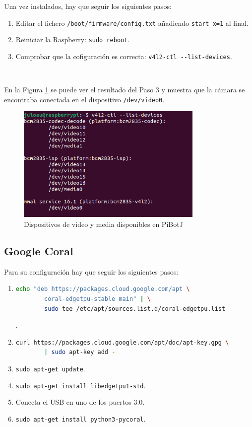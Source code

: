 Una vez instalados, hay que seguir los siguientes pasos: 

\begin{enumerate}
	\item Editar el fichero \verb|/boot/firmware/config.txt| añadiendo \verb|start_x=1| al final.
	\item Reiniciar la Raspberry: \verb|sudo reboot|.
	\item Comprobar que la cofiguración es correcta: \verb|v4l2-ctl --list-devices|.
\end{enumerate}\

En la Figura \ref{fig:v4l2} se puede ver el resultado del Paso 3 y muestra que la cámara se encontraba conectada en el dispositivo \verb|/dev/video0|.

\begin{figure} [h!]
	\begin{center}
		\includegraphics[width=9cm]{figs/cap6/vl.png}
	\end{center}
	\caption{Dispositivos de video y media disponibles en PiBotJ}
	\label{fig:v4l2}
\end{figure}


\subsection{Google Coral}
\label{subsec:anexogooglecoral}


Para su configuración hay que seguir los siguientes pasos: 

\begin{enumerate}
	\item 
	\begin{lstlisting}[language=bash]
		echo "deb https://packages.cloud.google.com/apt \
		coral-edgetpu-stable main" | \
		sudo tee /etc/apt/sources.list.d/coral-edgetpu.list
	\end{lstlisting}.
	\item
	\begin{lstlisting}[language=bash]
		curl https://packages.cloud.google.com/apt/doc/apt-key.gpg \
		| sudo apt-key add -
	\end{lstlisting}
	\item \verb|sudo apt-get update|.
	\item \verb|sudo apt-get install libedgetpu1-std|.
	\item Conecta el USB en uno de los puertos 3.0.
	\item \verb|sudo apt-get install python3-pycoral|.
\end{enumerate}\

